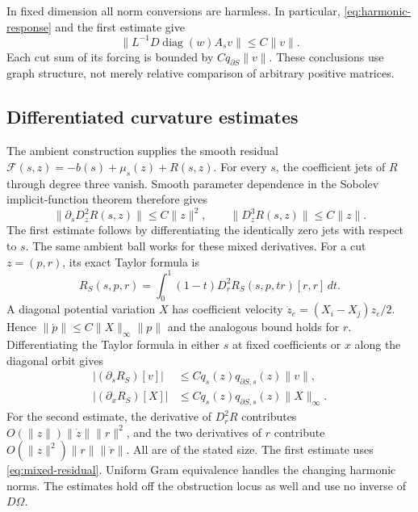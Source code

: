 \documentclass[11pt]{amsart}
\theoremstyle{definition}
\theoremstyle{remark}
\newcommand{\diag}{\operatorname{diag}}
\newcommand{\cF}{\mathcal F}
\begin{document}
In fixed dimension all norm conversions are harmless. In particular,
\eqref{eq:harmonic-response} and the first estimate give
\begin{equation}\label{eq:harmonic-forcing-bound}
 \|L^{-1}D\diag(w)A_s v\|\le C\|v\|.
\end{equation}
Each cut sum of its forcing is bounded by $Cq_{\partial S}\|v\|$.
These conclusions use graph structure, not merely relative comparison
of arbitrary positive matrices.

\subsection{Differentiated curvature estimates}
The ambient construction supplies the smooth residual
$\cF(s,z)=-b(s)+\mu_s(z)+R(s,z)$. For every $s$, the coefficient
jets of $R$ through degree three vanish. Smooth parameter dependence in the
Sobolev implicit-function theorem therefore gives
\begin{equation}\label{eq:mixed-residual}
 \|\partial_sD_z^2R(s,z)\|\le C\|z\|^2,
 \qquad \|D_z^3R(s,z)\|\le C\|z\|.
\end{equation}
The first estimate follows by differentiating the identically zero jets
with respect to $s$. The same ambient ball works for these mixed derivatives.
For a cut $z=(p,r)$, its exact Taylor formula is
\[
 R_S(s,p,r)=\int_0^1(1-t)D_r^2R_S(s,p,tr)[r,r]\,dt.
\]
A diagonal potential variation $X$ has coefficient velocity
$\dot z_e=(X_i-X_j)z_e/2$. Hence
$\|\dot p\|\le C\|X\|_\infty\|p\|$ and the analogous bound holds
for $r$. Differentiating the Taylor formula in either $s$ at fixed
coefficients or $x$ along the diagonal orbit gives
\begin{align}
 |(\partial_sR_S)[v]|&\le Cq_s(z)q_{\partial S,s}(z)\|v\|,
       \label{eq:derivative-cut-s}\\
 |(\partial_xR_S)[X]|&\le Cq_s(z)q_{\partial S,s}(z)\|X\|_\infty.
       \label{eq:derivative-cut-x}
\end{align}
For the second estimate, the derivative of $D_r^2R$ contributes
$O(\|z\|)\|\dot z\|\|r\|^2$, and the two derivatives of $r$
contribute $O(\|z\|^2)\|r\|\|\dot r\|$. All are of the stated
size. The first estimate uses \eqref{eq:mixed-residual}. Uniform Gram
equivalence handles the changing harmonic norms. The estimates hold off
the obstruction locus as well and use no inverse of $D\Omega$.
\end{document}
